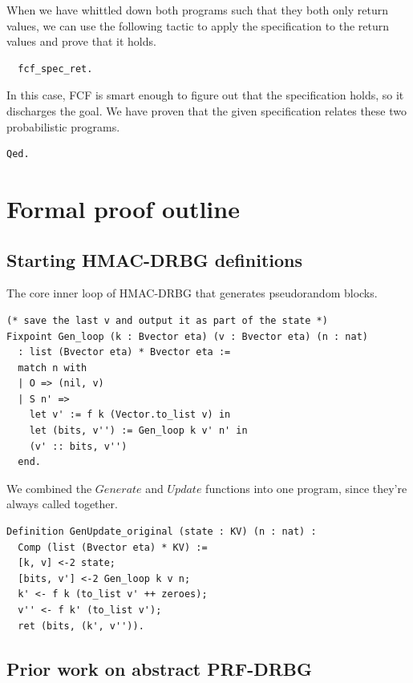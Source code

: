 \documentclass[12pt,lot, lof]{puthesis}
\begin{document}
{When we have whittled down both programs such that they both only return values, we can use the following tactic to apply the specification to the return values and prove that it holds. 

\begin{lstlisting}
  fcf_spec_ret.
\end{lstlisting}

In this case, FCF is smart enough to figure out that the specification holds, so it discharges the goal. We have proven that the given specification relates these two probabilistic programs. 

\begin{lstlisting}
Qed.
\end{lstlisting}

\section{Formal proof outline}

\subsection{Starting HMAC-DRBG definitions}

The core inner loop of HMAC-DRBG that generates pseudorandom blocks. 

\begin{lstlisting}
(* save the last v and output it as part of the state *)
Fixpoint Gen_loop (k : Bvector eta) (v : Bvector eta) (n : nat)
  : list (Bvector eta) * Bvector eta :=
  match n with
  | O => (nil, v)
  | S n' =>
    let v' := f k (Vector.to_list v) in
    let (bits, v'') := Gen_loop k v' n' in
    (v' :: bits, v'')           
  end.
\end{lstlisting}

We combined the $Generate$ and $Update$ functions into one program, since they're always called together.

\begin{lstlisting}
Definition GenUpdate_original (state : KV) (n : nat) :
  Comp (list (Bvector eta) * KV) :=
  [k, v] <-2 state;
  [bits, v'] <-2 Gen_loop k v n;
  k' <- f k (to_list v' ++ zeroes);
  v'' <- f k' (to_list v');
  ret (bits, (k', v'')).
\end{lstlisting}

\subsection{Prior work on abstract PRF-DRBG}

}
\end{document}
